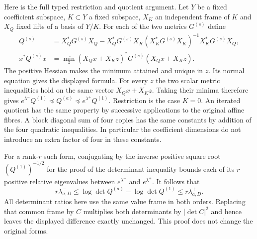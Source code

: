 \documentclass[11pt,a4paper]{article}
\begin{document}
Here is the full typed restriction and quotient argument. Let $Y$ be a
fixed coefficient subspace, $K\subset Y$ a fixed subspace, $X_K$ an
independent frame of $K$ and $X_Q$ fixed lifts of a basis of $Y/K$.
For each of the two metrics $G^{(s)}$ define
\[
\begin{aligned}
Q^{(s)}&=X_Q^*G^{(s)}X_Q-X_Q^*G^{(s)}X_K
 (X_K^*G^{(s)}X_K)^{-1}X_K^*G^{(s)}X_Q,\\
x^*Q^{(s)}x&=\min_z (X_Qx+X_Kz)^*G^{(s)}(X_Qx+X_Kz).
\end{aligned}\tag{EFP13}\label{efp:quotient}
\]
The positive Hessian makes the minimum attained and unique in $z$.
Its normal equation gives the displayed formula. For every $z$ the
two scalar metric inequalities hold on the same vector $X_Qx+X_Kz$.
Taking their minima therefore gives
$e^{\lambda^-}Q^{(1)}\preceq Q^{(a)}
 \preceq e^{\lambda^+}Q^{(1)}$.
Restriction is the case $K=0$. An iterated quotient has the same
property by successive applications to the original affine fibres.
A block diagonal sum of four copies has the same constants by addition
of the four quadratic inequalities. In particular the coefficient
dimensions do not introduce an extra factor of four in these constants.

For a rank-$r$ such form, conjugating by the inverse positive square root
$(Q^{(1)})^{-1/2}$ for the proof of the determinant inequality bounds each of
its $r$ positive relative eigenvalues between $e^{\lambda^-}$ and
$e^{\lambda^+}$. It follows that
\[
r\lambda^-_{a,D}\le
 \log\det Q^{(a)}-\log\det Q^{(1)}
 \le r\lambda^+_{a,D}.
\tag{EFP14}\label{efp:det}
\]
All determinant ratios here use the same value frame in both orders.
Replacing that common frame by $C$ multiplies both determinants by
$|\det C|^2$ and hence leaves the displayed difference exactly unchanged.
This proof does not change the original forms.
\end{document}
